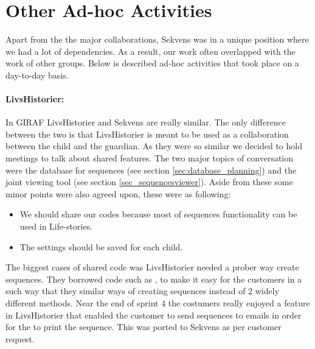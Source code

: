 \section{Other Ad-hoc Activities}\label{sec:adhoc}
Apart from the the major collaborations, Sekvens was in a unique position where we had a lot of dependencies. As a result, our work often overlapped with the work of other groups. Below is described ad-hoc activities that took place on a day-to-day basis.

\paragraph{LivsHistorier:} 
In GIRAF LivsHistorier and Sekvens are really similar. The only difference between the two is that LivsHistorier is meant to be used as a collaboration between the child and the guardian. As they were so similar we decided to hold meetings to talk about shared features. The two major topics of conversation were the database for sequences (see section \ref{sec:database_planning}) and the joint viewing tool (see section \ref{sec_sequencesviewer}). Aside from these some minor points were also agreed upon, these were as following:

\begin{itemize}
\item We should share our codes because most of sequences functionality can be used in Life-stories.
\item The settings should be saved for each child.
\end{itemize}

The biggest cases of shared code was LivsHistorier needed a prober way create sequences. They borrowed code such as , 
to make it easy for the customers in a such way that they similar ways of creating sequences instead of 2 widely different methods. Near the end of sprint 4 the costumers really enjoyed a feature in LivsHistorier that enabled the customer to send sequences to emails in order for the to print the sequence. This was ported to Sekvens as per customer request.

